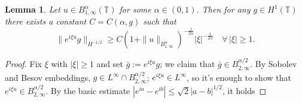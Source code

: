 \documentclass[11pt,oneside,reqno]{amsart}
\newcommand{\assign}{:=}
\newtheorem{lemma}[theorem]{Lemma}
\numberwithin{equation}{section}
\begin{document}
\begin{lemma}
  \label{lem:inviscid-lower-bound}Let $u \in B^{\alpha}_{1, \infty}
  (\mathbb{T})$ for some $\alpha \in (0, 1)$. Then for any $g \in H^1
  (\mathbb{T})$ there exists a constant $C = C (\alpha, g)$ such that
  \begin{equation}
    \| e^{i \xi u} g \|_{H^{- 1 / 2}} \geqslant C (1 + \| u \|_{B^{\alpha}_{1,
    \infty}})^{- \frac{1}{2 \alpha}}  | \xi |^{- \frac{1}{2 \alpha}} \quad
    \forall \, | \xi | \geqslant 1. \label{eq:inviscid-lower-bound}
  \end{equation}
\end{lemma}

\begin{proof}
  Fix $\xi$ with $| \xi | \geqslant 1$ and set $\bar{g} \assign e^{i \xi u}
  g$; we claim that $\bar{g} \in B^{\alpha / 2}_{2, \infty}$. By Sobolev and
  Besov embeddings, $g \in L^{\infty} \cap B^{\alpha / 2}_{2, \infty}$; $e^{i
  \xi u} \in L^{\infty}$, so it's enough to show that $e^{i \xi u} \in
  B^{\alpha / 2}_{2, \infty}$. By the basic estimate $| e^{i a} - e^{i b} |
  \leqslant \sqrt{2}  | a - b |^{1 / 2}$, it holds
  

\end{proof}
\end{document}
